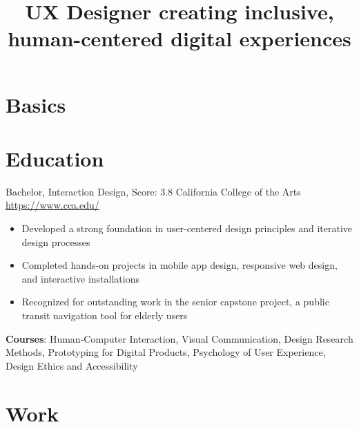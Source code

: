 \documentclass[a4paper, serif, 10pt]{moderncv}
\title{UX Designer creating inclusive, human-centered digital experiences}
\begin{document}
\maketitle

\section{Basics}

\section{Education}

        {Bachelor, Interaction Design, Score: 3.8}
        {California College of the Arts}
        {\url{https://www.cca.edu/}}
        {}
        {\begin{itemize}
\item Developed a strong foundation in user-centered design principles and iterative design processes
\item Completed hands-on projects in mobile app design, responsive web design, and interactive installations
\item Recognized for outstanding work in the senior capstone project, a public transit navigation tool for elderly users
\end{itemize}
\textbf{Courses}: Human-Computer Interaction, Visual Communication, Design Research Methods, Prototyping for Digital Products, Psychology of User Experience, Design Ethics and Accessibility}
\section{Work}
\end{document}
